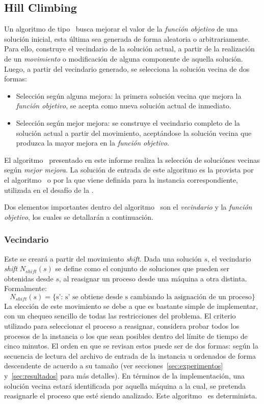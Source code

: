 \documentclass[../informe2.tex]{subfiles}
\begin{document}
\subsection{Hill Climbing}
Un algoritmo de tipo \hillc\ busca mejorar el valor de la \textit{función objetivo} de una solución inicial, esta última sea generada de forma aleatoria o arbitrariamente. Para ello, construye el vecindario de la solución actual, a partir de la realización de un \textit{movimiento} o modificación de alguna componente de aquella solución. Luego, a partir del vecindario generado, se selecciona la solución vecina de dos formas:
\begin{itemize}
	\item Selección según alguna mejora: la primera solución vecina que mejora la \textit{función objetivo}, se acepta como nueva solución actual de inmediato.
	\item Selección según mejor mejora: se construye el vecindario completo de la solución actual a partir del movimiento,  aceptándose la solución vecina que produzca la mayor mejora en la \textit{función objetivo}.
\end{itemize}
El algoritmo \hillc\ presentado en este informe realiza la selección de soluciónes vecinas según \textit{mejor mejora}. La solución de entrada de este algoritmo es la provista por el algoritmo \greedy\  o por la que viene definida para la instancia correspondiente, utilizada en el desafío de la \roadef. \par
\noindent Dos elementos importantes dentro del algoritmo \hillc\ son el \textit{vecindario} y la \textit{función objetivo}, los cuales se detallarán a continuación.

\subsubsection{Vecindario}
\label{subs:hill-climbing-vecindario}
Este se creará a partir del movimiento \textit{shift}. Dada una solución $s$, el vecindario \textit{shift} $N_{shift}(s)$ se define como el conjunto de soluciones que pueden ser obtenidas desde $s$, al reasignar un proceso desde una máquina a otra distinta. Formalmente:
\begin{equation}
	N_{shift}(s) = \{\text{s': s' se obtiene desde s cambiando la asignación de un proceso}\} \nonumber
\end{equation}
La elección de este movimiento se debe a que es bastante simple de implementar, con un chequeo sencillo de todas las restricciones del problema. El criterio utilizado para seleccionar el proceso a reasignar, considera probar todos los procesos de la instancia o los que sean posibles dentro del límite de tiempo de cinco minutos. El orden en que se revisan estos puede ser de dos formas: según la secuencia de lectura del archivo de entrada de la instancia u ordenados de forma descendente de acuerdo a su tamaño (ver secciones~\ref{sec:experimentos} y~\ref{sec:resultados} para más detalles). En términos de la implementación, una solución vecina estará identificada por aquella máquina a la cual, se pretenda reasignarle el proceso que esté siendo analizado. Este algoritmo \hillc\ es determinista.
\end{document}
